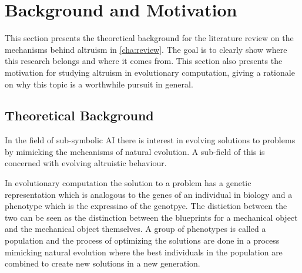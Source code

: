 \documentclass[a4paper]{book}
\begin{document}





\section{Background and Motivation}\label{cit}
\label{sec:BackgroundAndMotivation}

This section presents the theoretical background for the literature review on the mechanisms behind altruism in \ref{cha:review}. The goal is to clearly show where this research belongs and where it comes from. This section also presents the motivation for studying altruism in evolutionary computation, giving a rationale on why this topic is a worthwhile pursuit in general.

\subsection{Theoretical Background}

In the field of sub-symbolic AI there is interest in evolving solutions to problems by mimicking the mehcanisms of natural evolution. A sub-field of this is concerned with
evolving altruistic behaviour.

In evolutionary computation the solution to a problem has a genetic representation which is analogous to the genes of an individual in biology and a phenotype which is the expressino of the genotpye. The distiction between the two can be seen as the distinction between the blueprints for a mechanical object and the mechanical object themselves. A group of phenotypes is called a population and the process of optimizing the solutions are done in a process mimicking natural evolution where the best individuals in the population are combined to create new solutions in a new generation. 
\end{document}
